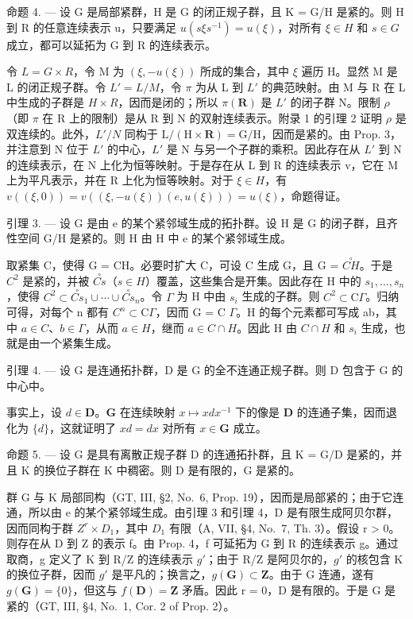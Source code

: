 命题 4. --- 设 G 是局部紧群，H 是 G 的闭正规子群，且 K = G/H 是紧的。则 H 到 R 的任意连续表示 u，只要满足 \(u(s\xi s^{-1}) = u(\xi)\)，对所有 \(\xi \in H\) 和 \(s \in G\) 成立，都可以延拓为 G 到 R 的连续表示。

令 \(L = G \times R\)，令 M 为 \((\xi, -u(\xi))\) 所成的集合，其中 \(\xi\) 遍历 H。显然 M 是 L 的闭正规子群。令 \(L' = L/M\)，令 \(\pi\) 为从 L 到 \(L'\) 的典范映射。由 M 与 R 在 L 中生成的子群是 \(H \times R\)，因而是闭的；所以 \(\pi(\mathbf{R})\) 是 \(L'\) 的闭子群 N。限制 \(\rho\)（即 \(\pi\) 在 R 上的限制）是从 R 到 N 的双射连续表示。附录 1 的引理 2 证明 \(\rho\) 是双连续的。此外，\(L'/N\) 同构于 \(\mathrm{L}/(\mathrm{H} \times \mathbf{R}) = \mathrm{G}/\mathrm{H}\)，因而是紧的。由 Prop. 3，并注意到 N 位于 \(L'\) 的中心，\(L'\) 是 N 与另一个子群的乘积。因此存在从 \(L'\) 到 N 的连续表示，在 N 上化为恒等映射。于是存在从 L 到 R 的连续表示 v，它在 M 上为平凡表示，并在 R 上化为恒等映射。对于 \(\xi \in H\)，有 \(v((\xi,0)) = v((\xi,-u(\xi))(e,u(\xi))) = u(\xi)\)，命题得证。

引理 3. --- 设 G 是由 e 的某个紧邻域生成的拓扑群。设 H 是 G 的闭子群，且齐性空间 G/H 是紧的。则 H 由 H 中 e 的某个紧邻域生成。

取紧集 C，使得 G = CH。必要时扩大 C，可设 C 生成 G，且 G = \(\overset{\circ}{CH}\)。于是 \(C^{2}\) 是紧的，并被 \(\overset{\circ}{Cs}\)（\(s \in H\)）覆盖，这些集合是开集。因此存在 H 中的 \(s_{1}, \ldots, s_{n}\)，使得 \(C^{2} \subset \overset{\circ}{Cs}_{1} \cup \cdots \cup \overset{\circ}{Cs}_{n}\)。令 \(\Gamma\) 为 H 中由 \(s_{i}\) 生成的子群。则 \(C^{2} \subset \mathrm{C}\Gamma\)。归纳可得，对每个 n 都有 \(C^{n} \subset \mathrm{C}\Gamma\)，因而 G = C \(\Gamma\)。H 的每个元素都可写成 ab，其中 \(a \in C\)、\(b \in \Gamma\)，从而 \(a \in H\)，继而 \(a \in C \cap H\)。因此 H 由 \(C \cap H\) 和 \(s_{i}\) 生成，也就是由一个紧集生成。

引理 4. --- 设 G 是连通拓扑群，D 是 G 的全不连通正规子群。则 D 包含于 G 的中心中。

事实上，设 \(d \in \mathbf{D}\)。\(\mathbf{G}\) 在连续映射 \(x \mapsto x dx^{-1}\) 下的像是 \(\mathbf{D}\) 的连通子集，因而退化为 \(\{d\}\)，这就证明了 \(xd = dx\) 对所有 \(x \in \mathbf{G}\) 成立。

命题 5. --- 设 G 是具有离散正规子群 D 的连通拓扑群，且 K = G/D 是紧的，并且 K 的换位子群在 K 中稠密。则 D 是有限的，G 是紧的。

群 G 与 K 局部同构（GT, III, §2, No.~6, Prop. 19），因而是局部紧的；由于它连通，所以由 e 的某个紧邻域生成。由引理 3 和引理 4，D 是有限生成阿贝尔群，因而同构于群 \(Z^{r} \times D_{1}\)，其中 \(D_{1}\) 有限（A, VII, §4, No.~7, Th. 3）。假设 r \textgreater{} 0。则存在从 D 到 Z 的表示 f。由 Prop. 4，f 可延拓为 G 到 R 的连续表示 g。通过取商，g 定义了 K 到 R/Z 的连续表示 \(g'\)；由于 R/Z 是阿贝尔的，\(g'\) 的核包含 K 的换位子群，因而 \(g'\) 是平凡的；换言之，\(g(\mathbf{G}) \subset \mathbf{Z}\)。由于 G 连通，遂有 \(g(\mathbf{G}) = \{0\}\)，但这与 \(f(\mathbf{D}) = \mathbf{Z}\) 矛盾。因此 r = 0，D 是有限的。于是 G 是紧的（GT, III, §4, No.~1, Cor. 2 of Prop. 2）。
\relax{}
